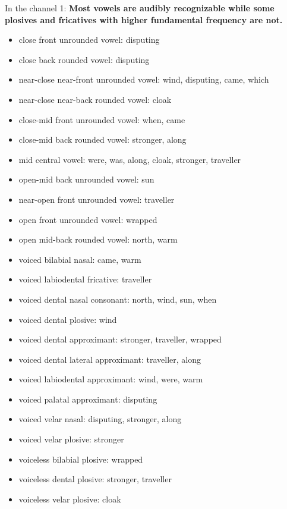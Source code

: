 \documentclass{../labbook}
\begin{document}
\begin{solution}

In the channel 1: \textbf{Most vowels are audibly recognizable while some plosives and fricatives with higher fundamental frequency are not.}
\begin{itemize}
    \item close front unrounded vowel: disputing
    \item close back rounded vowel: disputing
    \item near-close near-front unrounded vowel: wind, disputing, came, which
    \item near-close near-back rounded vowel: cloak
    \item close-mid front unrounded vowel: when, came
    \item close-mid back rounded vowel: stronger, along
    \item mid central vowel: were, was, along, cloak, stronger, traveller
    \item open-mid back unrounded vowel: sun
    \item near-open front unrounded vowel: traveller
    \item open front unrounded vowel: wrapped 
    \item open mid-back rounded vowel: north, warm
    \item voiced bilabial nasal: came, warm
    \item voiced labiodental fricative: traveller
    \item voiced dental nasal consonant: north, wind, sun, when
    \item voiced dental plosive: wind
    \item voiced dental approximant: stronger, traveller, wrapped
    \item voiced dental lateral approximant: traveller, along
    \item voiced labiodental approximant: wind, were, warm
    \item voiced palatal approximant: disputing
    \item voiced velar nasal: disputing, stronger, along
    \item voiced velar plosive: stronger
    \item voiceless bilabial plosive: wrapped
    \item voiceless dental plosive: stronger, traveller
    \item voiceless velar plosive: cloak
\end{itemize} 


\end{solution}
\end{document}
